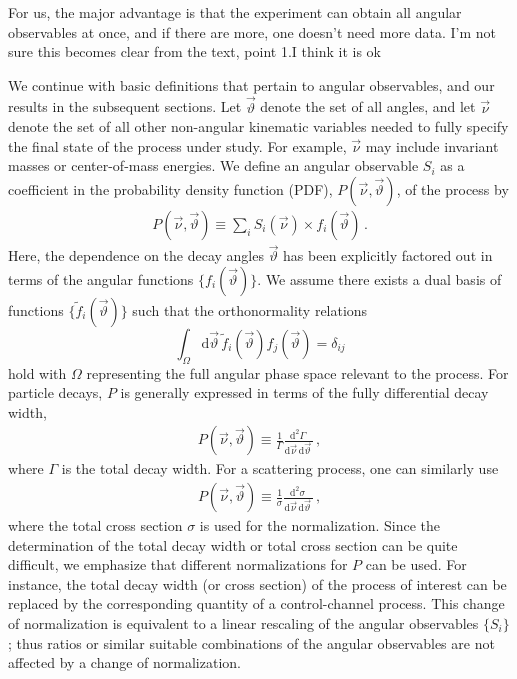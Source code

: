 \documentclass[aps,prd,reprint,nofootinbib,preprintnumbers]{revtex4}
\newcommand{\dual}[1]{\tilde{#1}}
\newcommand{\nuvec}{\vec{\nu}}
\newcommand{\rmdx}[1]{\mbox{d} #1 \,} %
\newcommand{\thvec}{\vec{\vartheta}}
\renewcommand{\theta}{\vartheta}
\newcommand{\fred}[1]{{\color{brown!85!black}#1}}
\newcommand{\marcin}[1]{{\color{cyan}#1}}
\newcommand{\add}[1]{\textcolor{green!85!black}{#1}}
\begin{document}
\fred{For us, the major advantage is that the experiment can obtain all angular observables at once, and if there are more, one doesn't need more data. I'm not sure this becomes clear from the text, point 1.}\marcin{I think it is ok}

We continue with basic definitions that pertain to angular observables, and our
results in the subsequent sections. Let $\thvec$ denote the set of all
angles, and let $\nuvec$ denote the set of all
other non-angular kinematic variables needed to fully specify the
final state of the process under study. For example, $\nuvec$ may
include invariant masses or center-of-mass energies. We define an
angular observable $S_i$ as a coefficient in the probability density
function (PDF), $P(\nuvec, \thvec)$, of the process by
\begin{align}
    \label{eq:def-P}
    P(\nuvec, \thvec) \equiv \sum_i S_i(\nuvec) \times f_i(\thvec)\,.
\end{align}
Here, the dependence on the decay angles $\thvec$ has been
explicitly factored out in terms of the angular functions
$\{f_i(\thvec)\}$. We assume there exists a dual basis of functions
$\{\dual{f}_i(\thvec)\}$ such that the orthonormality relations
\begin{equation}
    \label{eq:def-ortho-rel}
    \int_\Omega \rmdx{\vec{\theta}} \dual{f}_i(\thvec) f_j(\thvec)  = \delta_{ij}
\end{equation}
hold with $\Omega$ representing the full angular phase space relevant
to the process.  For particle decays, $P$ is generally expressed in
terms of the fully differential decay width,
\begin{align}
    \label{eq:def-P-decay}
    P(\nuvec, \thvec) \equiv \frac{1}{\Gamma}\frac{\rmdx{^{2}\Gamma}}{\rmdx{\vec\nu} \rmdx{\vec\theta}}\,,
\end{align}
where $\Gamma$ is the total decay width. For a scattering process, one can similarly use
\begin{align}
    \label{eq:def-P-scattering}
    P(\nuvec, \thvec) \equiv \frac{1}{\sigma}\frac{\rmdx{^{2}\sigma}}{\rmdx{\vec\nu} \rmdx{\vec\theta}}\,,
\end{align}
where the total cross section $\sigma$ is used for the
normalization. Since the determination of the total decay width or
total cross section can be quite difficult, we emphasize that
different normalizations for $P$ can be used.  For instance, the total
decay width (or cross section) of the process of interest can be
replaced by the corresponding quantity of a control-channel
process. This change of normalization is equivalent to a linear rescaling of
the angular observables $\lbrace S_i\rbrace$; thus ratios or similar suitable combinations
of the angular observables are not affected by \add{a} change of normalization.\\
\end{document}
